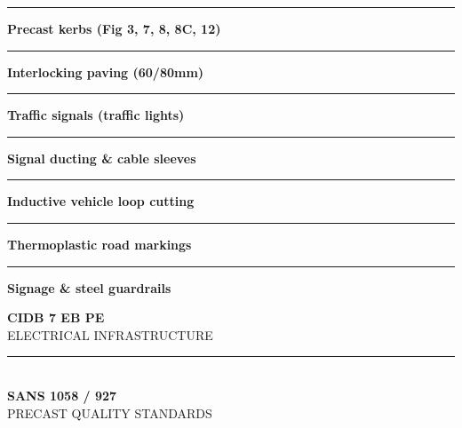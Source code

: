 \begin{minipage}[t]{0.34\textwidth}
    \vspace{0pt}
    \begin{tcolorbox}[
        enhanced, colback=mhoffwhite, colframe=mhnavy, boxrule=1pt, arc=4pt,
        title={\bfseries\color{white}\faTrafficLight\ Finishing Scope of Work},
        colbacktitle=mhnavy, left=7pt, right=7pt, top=6pt, bottom=6pt,
        drop shadow=black!6
    ]
        \fontsize{8.1pt}{11.6pt}\selectfont
        \textcolor{mhnavy}{\rule{4pt}{4pt}}\hspace{4pt}\textbf{Precast kerbs (Fig 3, 7, 8, 8C, 12)}\\
        \textcolor{mhnavy}{\rule{4pt}{4pt}}\hspace{4pt}\textbf{Interlocking paving (60/80mm)}\\
        \textcolor{mhnavy}{\rule{4pt}{4pt}}\hspace{4pt}\textbf{Traffic signals (traffic lights)}\\
        \textcolor{mhnavy}{\rule{4pt}{4pt}}\hspace{4pt}\textbf{Signal ducting \& cable sleeves}\\
        \textcolor{mhnavy}{\rule{4pt}{4pt}}\hspace{4pt}\textbf{Inductive vehicle loop cutting}\\
        \textcolor{mhnavy}{\rule{4pt}{4pt}}\hspace{4pt}\textbf{Thermoplastic road markings}\\
        \textcolor{mhnavy}{\rule{4pt}{4pt}}\hspace{4pt}\textbf{Signage \& steel guardrails}
    \end{tcolorbox}

    \vspace{0.20cm}

    \begin{tcolorbox}[
        enhanced, colback=white, colframe=mhlightgray, boxrule=0.8pt, arc=4pt,
        left=6pt, right=6pt, top=6pt, bottom=6pt, halign=center,
        drop shadow=black!4
    ]
        {\fontsize{18pt}{20pt}\selectfont\bfseries\color{mhblue}CIDB 7 EB PE}\\[1pt]
        {\fontsize{7.4pt}{9pt}\selectfont\color{mhtextmuted}\MakeUppercase{Electrical Infrastructure}}\\[4pt]
        \textcolor{mhlightgray}{\rule{3.2cm}{0.6pt}}\\[4pt]
        {\fontsize{13pt}{15pt}\selectfont\bfseries\color{mhnavy}SANS 1058 / 927}\\[1pt]
        {\fontsize{7.2pt}{9pt}\selectfont\color{mhtextmuted}\MakeUppercase{Precast Quality Standards}}
    \end{tcolorbox}
\end{minipage}

